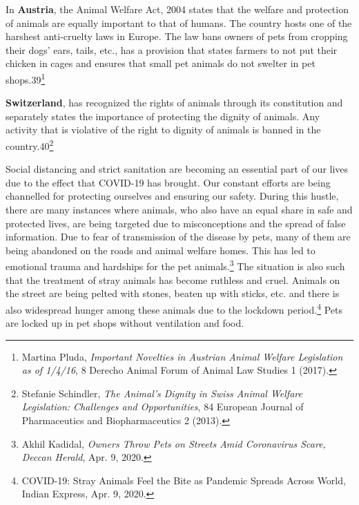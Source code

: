 \begin{multicols}{2}
\noi
In {\bf Austria}, the Animal Welfare Act, 2004 states that the welfare and protection of animals
are equally important to that of humans. The country hosts one of the harshest anti-cruelty
laws in Europe. The law bans owners of pets from cropping their dogs’ ears, tails, etc., has a
provision that states farmers to not put their chicken in cages and ensures that small pet
animals do not swelter in pet shops.39\footnote{Martina Pluda, \textit{Important Novelties in Austrian Animal Welfare Legislation as of 1/4/16}, 8 Derecho Animal Forum of Animal Law Studies 1 (2017).}

\noi
{\bf Switzerland}, has recognized the rights of animals through its constitution and separately
states the importance of protecting the dignity of animals. Any activity that is violative of the
right to dignity of animals is banned in the country.40\footnote{Stefanie Schindler, \textit{The Animal’s Dignity in Swiss Animal Welfare Legislation: Challenges and Opportunities}, 84 European Journal of Pharmaceutics and Biopharmaceutics 2 (2013).}


\noi
Social distancing and strict sanitation are becoming an essential part of our lives due to the
effect that COVID-19 has brought. Our constant efforts are being channelled for protecting
ourselves and ensuring our safety. During this hustle, there are many instances where
animals, who also have an equal share in safe and protected lives, are being targeted due to
misconceptions and the spread of false information. Due to fear of transmission of the disease
by pets, many of them are being abandoned on the roads and animal welfare homes. This has
led to emotional trauma and hardships for the pet animals.\footnote{Akhil Kadidal, \textit{Owners Throw Pets on Streets Amid Coronavirus Scare, Deccan Herald}, Apr. 9, 2020. } The situation is also such that the
treatment of stray animals has become ruthless and cruel. Animals on the street are being
pelted with stones, beaten up with sticks, etc. and there is also widespread hunger among these animals due to the lockdown period.\footnote{ COVID-19: Stray Animals Feel the Bite as Pandemic Spreads Across World, Indian Express, Apr. 9, 2020.} Pets are locked up in pet shops without
ventilation and food.


\end{multicols}
